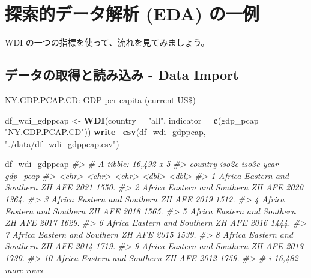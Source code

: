 \documentclass[
  xelatex, ja=standard]{bxjsbook}
\newenvironment{Shaded}{\begin{snugshade}}{\end{snugshade}}
\newcommand{\AttributeTok}[1]{\textcolor[rgb]{0.13,0.29,0.53}{#1}}
\newcommand{\CommentTok}[1]{\textcolor[rgb]{0.56,0.35,0.01}{\textit{#1}}}
\newcommand{\FunctionTok}[1]{\textcolor[rgb]{0.13,0.29,0.53}{\textbf{#1}}}
\newcommand{\NormalTok}[1]{#1}
\newcommand{\OtherTok}[1]{\textcolor[rgb]{0.56,0.35,0.01}{#1}}
\newcommand{\StringTok}[1]{\textcolor[rgb]{0.31,0.60,0.02}{#1}}
\theoremstyle{definition}
\theoremstyle{definition}
\theoremstyle{definition}
\theoremstyle{definition}
\theoremstyle{remark}
\begin{document}
\hypertarget{ux63a2ux7d22ux7684ux30c7ux30fcux30bfux89e3ux6790-eda-ux306eux4e00ux4f8b}{%
\section{探索的データ解析 (EDA) の一例}\label{ux63a2ux7d22ux7684ux30c7ux30fcux30bfux89e3ux6790-eda-ux306eux4e00ux4f8b}}

WDI の一つの指標を使って、流れを見てみましょう。

\hypertarget{ux30c7ux30fcux30bfux306eux53d6ux5f97ux3068ux8aadux307fux8fbcux307f---data-import}{%
\subsection{データの取得と読み込み - Data Import}\label{ux30c7ux30fcux30bfux306eux53d6ux5f97ux3068ux8aadux307fux8fbcux307f---data-import}}

NY.GDP.PCAP.CD: GDP per capita (current US\$)

\begin{Shaded}
\begin{Highlighting}[]
\NormalTok{df\_wdi\_gdppcap }\OtherTok{\textless{}{-}} \FunctionTok{WDI}\NormalTok{(}\AttributeTok{country =} \StringTok{"all"}\NormalTok{, }\AttributeTok{indicator =} \FunctionTok{c}\NormalTok{(}\AttributeTok{gdp\_pcap =} \StringTok{"NY.GDP.PCAP.CD"}\NormalTok{))}
\FunctionTok{write\_csv}\NormalTok{(df\_wdi\_gdppcap, }\StringTok{"./data/df\_wdi\_gdppcap.csv"}\NormalTok{)}
\end{Highlighting}
\end{Shaded}

\begin{Shaded}
\begin{Highlighting}[]
\NormalTok{df\_wdi\_gdppcap}
\CommentTok{\#\textgreater{} \# A tibble: 16,492 x 5}
\CommentTok{\#\textgreater{}    country                     iso2c iso3c  year gdp\_pcap}
\CommentTok{\#\textgreater{}    \textless{}chr\textgreater{}                       \textless{}chr\textgreater{} \textless{}chr\textgreater{} \textless{}dbl\textgreater{}    \textless{}dbl\textgreater{}}
\CommentTok{\#\textgreater{}  1 Africa Eastern and Southern ZH    AFE    2021    1550.}
\CommentTok{\#\textgreater{}  2 Africa Eastern and Southern ZH    AFE    2020    1364.}
\CommentTok{\#\textgreater{}  3 Africa Eastern and Southern ZH    AFE    2019    1512.}
\CommentTok{\#\textgreater{}  4 Africa Eastern and Southern ZH    AFE    2018    1565.}
\CommentTok{\#\textgreater{}  5 Africa Eastern and Southern ZH    AFE    2017    1629.}
\CommentTok{\#\textgreater{}  6 Africa Eastern and Southern ZH    AFE    2016    1444.}
\CommentTok{\#\textgreater{}  7 Africa Eastern and Southern ZH    AFE    2015    1539.}
\CommentTok{\#\textgreater{}  8 Africa Eastern and Southern ZH    AFE    2014    1719.}
\CommentTok{\#\textgreater{}  9 Africa Eastern and Southern ZH    AFE    2013    1730.}
\CommentTok{\#\textgreater{} 10 Africa Eastern and Southern ZH    AFE    2012    1759.}
\CommentTok{\#\textgreater{} \# i 16,482 more rows}
\end{Highlighting}
\end{Shaded}
\end{document}
